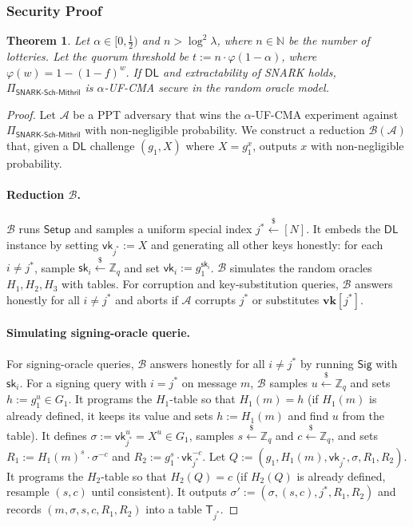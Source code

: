 \documentclass{article}
\newtheorem{theorem}{Theorem}[section]
\newcommand{\sk}[0]{\mathsf{sk}}
\newcommand{\vk}[0]{\mathsf{vk}}
\newcommand{\getsr}{\xleftarrow{\$}}
\begin{document}
\subsubsection{Security Proof}

\begin{theorem}
Let $\alpha\in[0,\tfrac12)$ and $n>\log^2\lambda$, where $n\in\mathbb{N}$ be the number of lotteries. Let the quorum threshold be $t :=  n\cdot \varphi(1-\alpha)$, where $\varphi(w) = 1-(1-f)^w.$
If $\mathsf{DL}$ and extractability of SNARK holds, $\Pi_{\mathsf{SNARK\text{-}Sch\text{-}Mithril}}$ is $\alpha$-\textsf{UF-CMA} secure in the random oracle model.
\end{theorem}

\begin{proof}
Let $\mathcal{A}$ be a PPT adversary that wins the $\alpha$-\textsf{UF-CMA} experiment against $\Pi_{\mathsf{SNARK\text{-}Sch\text{-}Mithril}}$ with non-negligible probability. We construct a reduction $\mathcal{B}(\mathcal{A})$ that, given a $\mathsf{DL}$ challenge $(g_1,X)$ where $X=g_1^{x}$, outputs $x$ with non-negligible probability.


\paragraph{Reduction $\mathcal{B}$.}
$\mathcal{B}$ runs $\mathsf{Setup}$ and samples a uniform special index $j^\ast\getsr[N]$. It embeds the $\mathsf{DL}$ instance by setting $\vk_{j^\ast}:=X$ and generating all other keys honestly: for each $i\neq j^\ast$, sample $\sk_i\getsr\mathbb{Z}_q$ and set $\vk_i:=g_1^{\sk_i}$. $\mathcal{B}$ simulates the random oracles $H_1,H_2,H_3$ with tables. For corruption and key-substitution queries, $\mathcal{B}$ answers honestly for all $i\neq j^\ast$ and aborts if $\mathcal{A}$ corrupts $j^\ast$ or substitutes $\mathbf{vk}[j^\ast]$.


\paragraph{Simulating signing-oracle querie.}
For signing-oracle queries, $\mathcal{B}$ answers honestly for all $i\neq j^\ast$ by running $\mathsf{Sig}$ with $\sk_i$. For a signing query with $i=j^\ast$ on message $m$, $\mathcal{B}$ samples $u\getsr \mathbb{Z}_q$ and sets $h:=g_1^{u}\in G_1$. It programs the $H_1$-table so that $H_1(m)=h$ (if $H_1(m)$ is already defined, it keeps its value and sets $h:=H_1(m)$ and find $u$ from the table). It defines $\sigma := \vk_{j^\ast}^{u} = X^{u}\in G_1$, samples $s\getsr \mathbb{Z}_q$ and $c\getsr \mathbb{Z}_q$, and sets $R_1 := H_1(m)^{s}\cdot \sigma^{-c}$ and $R_2 := g_1^{s}\cdot \vk_{j^\ast}^{-c}$. Let $Q := (g_1,H_1(m),\vk_{j^\ast},\sigma,R_1,R_2)$. It programs the $H_2$-table so that $H_2(Q)=c$ (if $H_2(Q)$ is already defined, resample $(s,c)$ until consistent). It outputs $\sigma' := (\sigma,(s,c),j^\ast,R_1,R_2)$ and records $(m,\sigma,s,c,R_1,R_2)$ into a table $\mathsf{T}_{j^\ast}$.


\end{proof}
\end{document}
